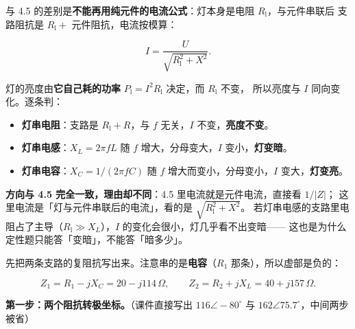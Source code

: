 \documentclass[11pt]{ctexart}
\begin{document}
与 4.5 的差别是\textbf{不能再用纯元件的电流公式}：灯本身是电阻 $R_{\mathrm{l}}$，与元件串联后
支路阻抗是 $R_{\mathrm{l}}+$ 元件阻抗，电流按模算：

\[ I=\frac{U}{\sqrt{R_{\mathrm{l}}^{2}+X^{2}}} . \]

灯的亮度由\textbf{它自己耗的功率} $P_{\mathrm{l}}=I^{2}R_{\mathrm{l}}$ 决定，而 $R_{\mathrm{l}}$ 不变，
所以亮度与 $I$ 同向变化。逐条判：

\begin{itemize}
\item \textbf{灯串电阻}：支路是 $R_{\mathrm{l}}+R$，与 $f$ 无关，$I$ 不变，\textbf{亮度不变}。
\item \textbf{灯串电感}：$X_L=2\pi fL$ 随 $f$ 增大，分母变大，$I$ 变小，\textbf{灯变暗}。
\item \textbf{灯串电容}：$X_C=1/(2\pi fC)$ 随 $f$ 增大而变小，分母变小，$I$ 变大，\textbf{灯变亮}。
\end{itemize}

\textbf{方向与 4.5 完全一致，理由却不同}：4.5 里电流就是元件电流，直接看 $1/|Z|$；
这里电流是「灯与元件串联后的电流」，看的是 $\sqrt{R_{\mathrm{l}}^2+X^2}$。
若灯串电感的支路里电阻占了主导（$R_{\mathrm{l}}\gg X_L$），$I$ 的变化会很小，灯几乎看不出变暗——
这也是为什么定性题只能答「变暗」，不能答「暗多少」。




先把两条支路的复阻抗写出来。注意串的是\textbf{电容}（$R_1$ 那条），所以虚部是负的：

\[ Z_1=R_1-jX_C=20-j114\,\Omega ,\qquad
   Z_2=R_2+jX_L=40+j157\,\Omega . \]


\textbf{第一步：两个阻抗转极坐标。}（课件直接写出 $116\angle-80^\circ$ 与 $162\angle75.7^\circ$，中间两步被省）
\end{document}
